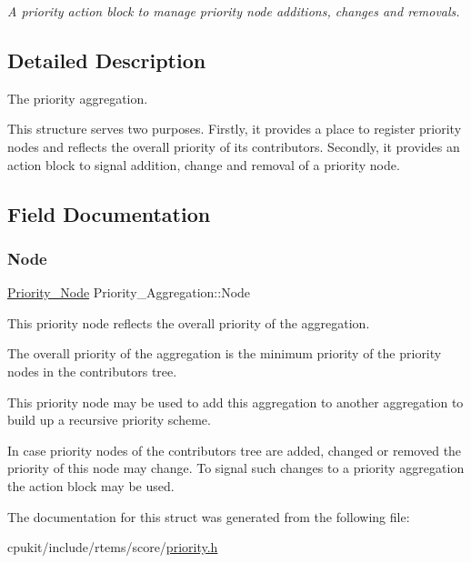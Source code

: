 \begin{DoxyCompactItemize}
\begin{tabbing}
\end{tabbing}\begin{DoxyCompactList}\small\item\em A priority action block to manage priority node additions, changes and removals. \end{DoxyCompactList}\end{DoxyCompactItemize}


\subsection{Detailed Description}
The priority aggregation. 

This structure serves two purposes. Firstly, it provides a place to register priority nodes and reflects the overall priority of its contributors. Secondly, it provides an action block to signal addition, change and removal of a priority node. 

\subsection{Field Documentation}
\mbox{\label{structPriority__Aggregation_a9769b8a56c790588ea6994f787a03a95}} 
\subsubsection{\texorpdfstring{Node}{Node}}
{\footnotesize\ttfamily \mbox{\hyperlink{structPriority__Node}{Priority\+\_\+\+Node}} Priority\+\_\+\+Aggregation\+::\+Node}



This priority node reflects the overall priority of the aggregation. 

The overall priority of the aggregation is the minimum priority of the priority nodes in the contributors tree.

This priority node may be used to add this aggregation to another aggregation to build up a recursive priority scheme.

In case priority nodes of the contributors tree are added, changed or removed the priority of this node may change. To signal such changes to a priority aggregation the action block may be used. 

The documentation for this struct was generated from the following file\+:\begin{DoxyCompactItemize}
\item 
cpukit/include/rtems/score/\mbox{\hyperlink{rtems_2score_2priority_8h}{priority.\+h}}\end{DoxyCompactItemize}
